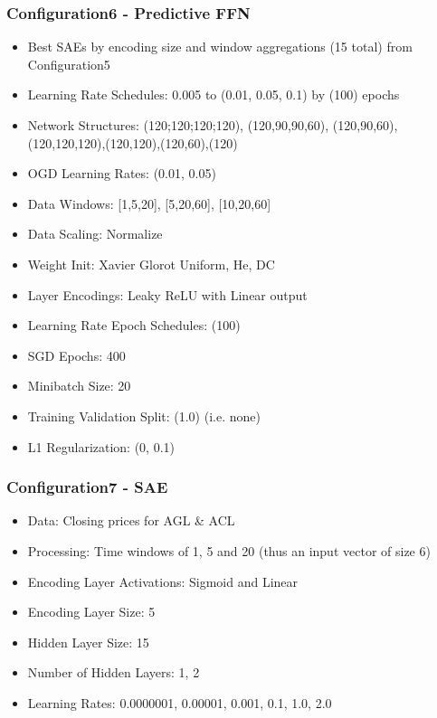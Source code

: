\documentclass[a4paper,11pt,oneside]{article}
\theoremstyle{plain}
\theoremstyle{definition}
\begin{document}
\subsubsection{Configuration6 - Predictive FFN}\label{config6}

\begin{itemize}
	\item Best SAEs by encoding size and window aggregations (15 total) from Configuration5
	\item Learning Rate Schedules: 0.005 to (0.01, 0.05, 0.1) by (100) epochs
	\item Network Structures: (120;120;120;120), (120,90,90,60), (120,90,60),(120,120,120),(120,120),(120,60),(120)
	\item OGD Learning Rates: (0.01, 0.05)
	\item Data Windows: [1,5,20], [5,20,60], [10,20,60]
	\item Data Scaling: Normalize
	\item Weight Init: Xavier Glorot Uniform, He, DC
	\item Layer Encodings: Leaky ReLU with Linear output
	\item Learning Rate Epoch Schedules: (100)
	\item SGD Epochs: 400
	\item Minibatch Size: 20
	\item Training Validation Split: (1.0) (i.e. none)
	\item L1 Regularization: (0, 0.1)
\end{itemize}

\subsubsection{Configuration7 - SAE}\label{config7}

\begin{itemize}
	\item Data: Closing prices for AGL \& ACL
	\item Processing: Time windows of 1, 5 and 20 (thus an input vector of size 6)
	\item Encoding Layer Activations: Sigmoid and Linear
	\item Encoding Layer Size: 5
	\item Hidden Layer Size: 15
	\item Number of Hidden Layers: 1, 2
	\item Learning Rates: 0.0000001, 0.00001, 0.001, 0.1, 1.0, 2.0
\end{itemize}
\end{document}

